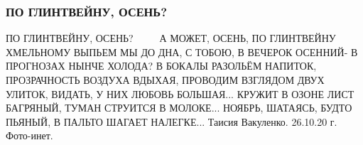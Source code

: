  
 
 

\subsubsection{ПО ГЛИНТВЕЙНУ, ОСЕНЬ?}

ПО ГЛИНТВЕЙНУ, ОСЕНЬ?  🍂🌿🍁🍂🌿🍁🍂
А МОЖЕТ, ОСЕНЬ, ПО ГЛИНТВЕЙНУ
ХМЕЛЬНОМУ ВЫПЬЕМ МЫ ДО ДНА,
С ТОБОЮ, В ВЕЧЕРОК ОСЕННИЙ-
В ПРОГНОЗАХ НЫНЧЕ ХОЛОДА?
В БОКАЛЫ РАЗОЛЬЁМ НАПИТОК,
ПРОЗРАЧНОСТЬ ВОЗДУХА ВДЫХАЯ,
ПРОВОДИМ ВЗГЛЯДОМ ДВУХ УЛИТОК,
ВИДАТЬ, У НИХ  ЛЮБОВЬ БОЛЬШАЯ...
КРУЖИТ В ОЗОНЕ ЛИСТ БАГРЯНЫЙ,
ТУМАН СТРУИТСЯ В МОЛОКЕ...
НОЯБРЬ, ШАТАЯСЬ, БУДТО ПЬЯНЫЙ,
В ПАЛЬТО ШАГАЕТ НАЛЕГКЕ...
Таисия Вакуленко. 
26.10.20 г.
Фото-инет.
